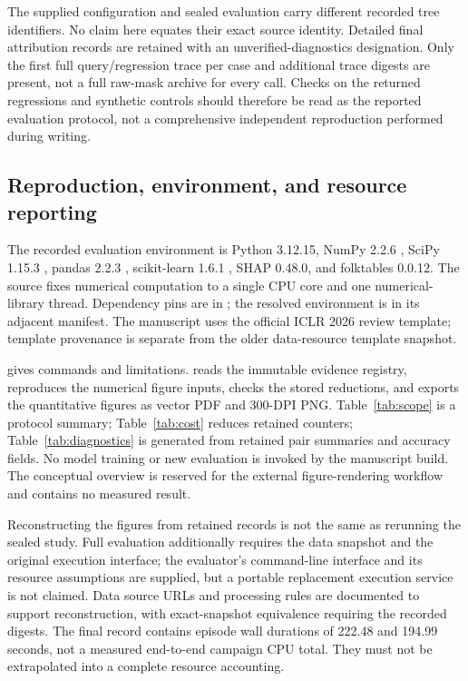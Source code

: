 \documentclass{article}
\begin{document}
The supplied configuration and sealed evaluation carry different recorded tree identifiers. No claim here equates their exact source identity. Detailed final attribution records are retained with an unverified-diagnostics designation. Only the first full query/regression trace per case and additional trace digests are present, not a full raw-mask archive for every call. Checks on the returned regressions and synthetic controls should therefore be read as the reported evaluation protocol, not a comprehensive independent reproduction performed during writing.

\subsection{Reproduction, environment, and resource reporting}
The recorded evaluation environment is Python 3.12.15, NumPy 2.2.6 \citep{Harris2020}, SciPy 1.15.3 \citep{Virtanen2020}, pandas 2.2.3 \citep{McKinney2010}, scikit-learn 1.6.1 \citep{Pedregosa2011}, SHAP 0.48.0, and folktables 0.0.12. The source fixes numerical computation to a single CPU core and one numerical-library thread. Dependency pins are in ; the resolved environment is in its adjacent manifest. The manuscript uses the official ICLR 2026 review template; template provenance is separate from the older data-resource template snapshot.

 gives commands and limitations.  reads the immutable evidence registry, reproduces the numerical figure inputs, checks the stored reductions, and exports the quantitative figures as vector PDF and 300-DPI PNG. Table~\ref{tab:scope} is a protocol summary; Table~\ref{tab:cost} reduces retained counters; Table~\ref{tab:diagnostics} is generated from retained pair summaries and accuracy fields. No model training or new evaluation is invoked by the manuscript build. The conceptual overview is reserved for the external figure-rendering workflow and contains no measured result.

Reconstructing the figures from retained records is not the same as rerunning the sealed study. Full evaluation additionally requires the data snapshot and the original execution interface; the evaluator's command-line interface and its resource assumptions are supplied, but a portable replacement execution service is not claimed. Data source URLs and processing rules are documented to support reconstruction, with exact-snapshot equivalence requiring the recorded digests. The final record contains episode wall durations of 222.48 and 194.99 seconds, not a measured end-to-end campaign CPU total. They must not be extrapolated into a complete resource accounting.
\end{document}
